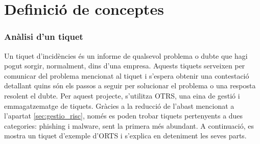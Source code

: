 \section{Definició de conceptes}
\subsubsection{Anàlisi d'un tiquet}
Un tiquet d'incidències és un informe de qualsevol problema o dubte que hagi pogut sorgir, normalment, dins d'una empresa. Aquests tiquets serveixen per comunicar del problema mencionat al tiquet i s'espera obtenir una contestació detallant quins són els passos a seguir per solucionar el problema o una resposta resolent el dubte. Per aquest projecte, s'utilitza OTRS, una eina de gestió i emmagatzematge de tiquets. Gràcies a la reducció de l'abast mencionat a l'apartat \ref{sec:gestio_risc}, només es poden trobar tiquets pertenyents a dues categories: phishing i malware, sent la primera més abundant. A continuació, es mostra un tiquet d'exemple d'ORTS i s'explica en deteniment les seves parts.

